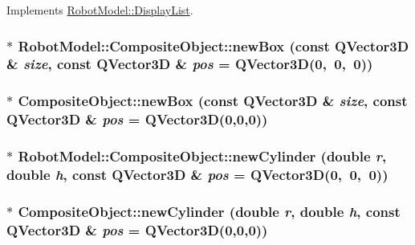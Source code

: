 Implements \hyperlink{class_robot_model_1_1_display_list_a842de97924298c7363e50aebd69e5a50}{RobotModel::DisplayList}.\hypertarget{class_robot_model_1_1_composite_object_a1085d65dd82c9c7033d52ac64b1fcd78}{
\subsubsection[{newBox}]{$\ast$ RobotModel::CompositeObject::newBox (const QVector3D \& {\em size}, \/  const QVector3D \& {\em pos} = {\ttfamily QVector3D(0,~0,~0)})}}
\label{class_robot_model_1_1_composite_object_a1085d65dd82c9c7033d52ac64b1fcd78}
\hypertarget{class_robot_model_1_1_composite_object_a869235cebecc6802b9c63ce7e2359ddb}{
\subsubsection[{newBox}]{ $\ast$ CompositeObject::newBox (const QVector3D \& {\em size}, \/  const QVector3D \& {\em pos} = {\ttfamily QVector3D(0,0,0)})}}
\label{class_robot_model_1_1_composite_object_a869235cebecc6802b9c63ce7e2359ddb}
\hypertarget{class_robot_model_1_1_composite_object_a6140b34248d84bf28886ef206588126b}{
\subsubsection[{newCylinder}]{$\ast$ RobotModel::CompositeObject::newCylinder (double {\em r}, \/  double {\em h}, \/  const QVector3D \& {\em pos} = {\ttfamily QVector3D(0,~0,~0)})}}
\label{class_robot_model_1_1_composite_object_a6140b34248d84bf28886ef206588126b}
\hypertarget{class_robot_model_1_1_composite_object_a196a2811a85c1313f781b140f2ab313e}{
\subsubsection[{newCylinder}]{ $\ast$ CompositeObject::newCylinder (double {\em r}, \/  double {\em h}, \/  const QVector3D \& {\em pos} = {\ttfamily QVector3D(0,0,0)})}}
